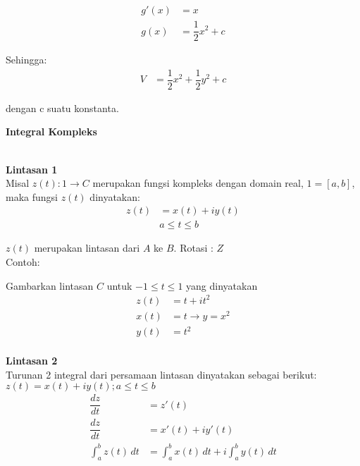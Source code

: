 \documentclass{article}
\begin{document}
    \begin{align}
        g'(x)   &= x
        \nonumber\\
        g(x)    &= \dfrac{1}{2} x^2 + c
        \nonumber
    \end{align}
    
    Sehingga:
    \begin{align}
        V   &= \dfrac{1}{2} x^2 + \dfrac{1}{2} y^2 + c
        \nonumber
    \end{align}

    dengan c suatu konstanta.


    \newpage
    \begin{center}
        \textbf{Integral Kompleks}
    \end{center}
    \leavevmode\\

    \textbf{Lintasan 1}
    \\
    
    Misal $z(t) : 1 \rightarrow C$ merupakan fungsi kompleks dengan domain real, $1=[a,b]$, maka fungsi $z(t)$ dinyatakan:
    \begin{align}
        z(t) &= x(t) + iy(t)
        \nonumber\\
        &a \leq t \leq b
        \nonumber
    \end{align}
    

    $z(t)$ merupakan lintasan dari $A$ ke $B$. Rotasi : $Z$\\
    
    Contoh:
    
    Gambarkan lintasan  $C$ untuk $-1 \leq t \leq 1$ yang dinyatakan
    \begin{align}
        z(t)    &= t + it^2
        \nonumber\\
        x(t)    &= t \rightarrow y= x^2
        \nonumber\\
        y(t)    &= t^2
        \nonumber
    \end{align}
    \leavevmode\\

    \textbf{Lintasan 2}
    \\

    Turunan 2 integral dari persamaan lintasan dinyatakan sebagai berikut:
    $z(t) =x(t) +i y(t) ; a \leq t \leq b$
    \begin{align}
        \dfrac{dz}{dt}  &= z'(t)
        \nonumber\\
        \dfrac{dz}{dt}  &= x'(t) + iy'(t)
        \nonumber\\
        \int_{a}^{b} z(t) \,dt &=\int_{a}^{b} x(t) \,dt + i \int_{a}^{b} y(t) \,dt 
        \nonumber
    \end{align}
    \leavevmode\\
\end{document}
